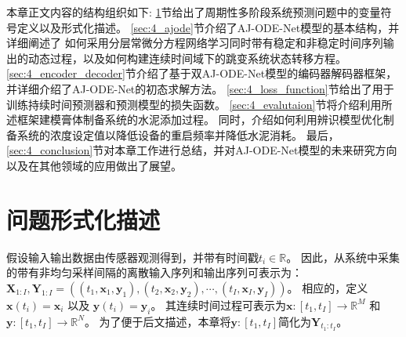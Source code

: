 本章正文内容的结构组织如下:
\ref{sec:4_notations}节给出了周期性多阶段系统预测问题中的变量符号定义以及形式化描述。
\ref{sec:4_ajode}节介绍了AJ-ODE-Net模型的基本结构，并详细阐述了
如何采用分层常微分方程网络学习同时带有稳定和非稳定时间序列输出的动态过程，以及如何构建连续时间域下的跳变系统状态转移方程。
\ref{sec:4_encoder_decoder}节介绍了基于双AJ-ODE-Net模型的编码器解码器框架，并详细介绍了AJ-ODE-Net的初态求解方法。
\ref{sec:4_loss_function}节给出了用于训练持续时间预测器和预测模型的损失函数。
\ref{sec:4_evalutaion}节将介绍利用所述框架建模膏体制备系统的水泥添加过程。
同时，介绍如何利用辨识模型优化制备系统的浓度设定值以降低设备的重启频率并降低水泥消耗。
最后，\ref{sec:4_conclusion}节对本章工作进行总结，并对AJ-ODE-Net模型的未来研究方向以及在其他领域的应用做出了展望。


\section{问题形式化描述}
\label{sec:4_notations}
假设输入输出数据由传感器观测得到，并带有时间戳$t_i\in \mathbb{R}$。
因此，从系统中采集的带有非均匀采样间隔的离散输入序列和输出序列可表示为：
$\boldsymbol X_{1:I},\boldsymbol Y_{1:I}= ((t_1,\boldsymbol x_1,\boldsymbol y_1),(t_2,\boldsymbol x_2, \boldsymbol y_2),\cdots,(t_I,\boldsymbol x_I,\boldsymbol y_I))$。
相应的，定义$\boldsymbol x(t_i)=\boldsymbol x_i$ 以及 $\boldsymbol y(t_i)=\boldsymbol y_i$。
其连续时间过程可表示为$\boldsymbol x:\left[t_{1}, t_{I}\right] \rightarrow \mathbb{R}^{M}$ 和 $\boldsymbol y:\left[t_{1}, t_{I}\right] \rightarrow \mathbb{R}^{N}$。
为了便于后文描述，本章将$\boldsymbol y:\left[t_{1}, t_{I}\right]$简化为$\boldsymbol Y_{t_1:t_I}$。


